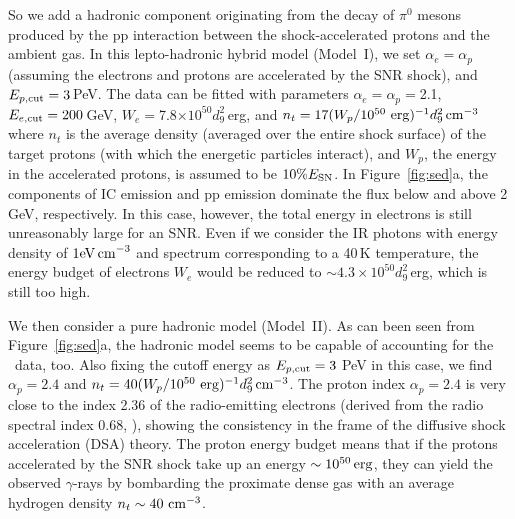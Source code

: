 \documentclass[12pt,preprint]{aastex}
\newcommand{\erg}{\,{\rm erg}}        \newcommand{\K}{\,{\rm K}}
\newcommand{\du}{d_{9}} \newcommand{\Du}{D_{20}}
\newcommand{\gray}{{\rm $\gamma$-ray}}
\begin{document}
So we add a hadronic component 
originating from the decay of $\pi^0$ mesons produced by the pp
interaction between the shock-accelerated protons and the ambient gas. 
In this lepto-hadronic hybrid model
(Model~I), 
we set $\alpha_e=\alpha_p$  (assuming the electrons and protons
are accelerated by the SNR shock),
and $E_{p,{\rm cut}}=3$\,PeV.
The data can be fitted with parameters $\alpha_e=\alpha_p=$2.1, 
$E_{e,{\rm cut}}=200$\,GeV, 
$W_e =$7.8$\times10^{50}\du^2$\,erg,  and
$n_t=17(W_p/10^{50}\ {\rm erg})^{-1}\du^2\,{\rm cm}^{-3}$
where $n_t$ is the average density (averaged over the entire shock surface) 
of the target protons (with which the energetic particles interact),
and $W_p$, the energy in the accelerated protons, is assumed to be
$10\%E_{\rm SN}$.
In Figure~\ref{fig:sed}a, the components of IC emission and
pp emission dominate the flux below and above 2\,GeV, respectively.
In this case, however, the total energy in electrons is still
unreasonably large for an SNR.
Even if we consider the IR photons with energy density
of $1 {\rm eV\,cm}^{-3}$ and spectrum corresponding to a 40\,K temperature,
the energy budget of electrons $W_e$ would be reduced to
 $\sim4.3\times10^{50}\du^2$\,erg, which is still too high.

We  then consider a pure hadronic model (Model~II).
As can been seen from Figure~\ref{fig:sed}a,
the hadronic model seems to be capable of accounting for the \Fermi\ data, too.
Also fixing the cutoff energy as $E_{p,{\rm cut}}=3$ PeV in this case, 
we find $\alpha_p=2.4$ and 
$n_t=40(W_p/10^{50}\ {\rm erg})^{-1}\du^2\,{\rm cm}^{-3}$.
The proton index $\alpha_p=2.4$ is very close to the index 2.36 of the
radio-emitting electrons
(derived from the radio spectral index 0.68, \citealt{Green2009snrcatalog}),
showing the consistency in the frame of the diffusive shock acceleration (DSA) theory.
The proton energy budget means that if the protons accelerated by the SNR shock
take up an energy $\sim10^{50}\erg$,
they can yield the observed \gray{s} by bombarding the proximate
dense gas with an average hydrogen density $n_t\sim 40\ {\rm cm^{-3}}$.
\end{document}

